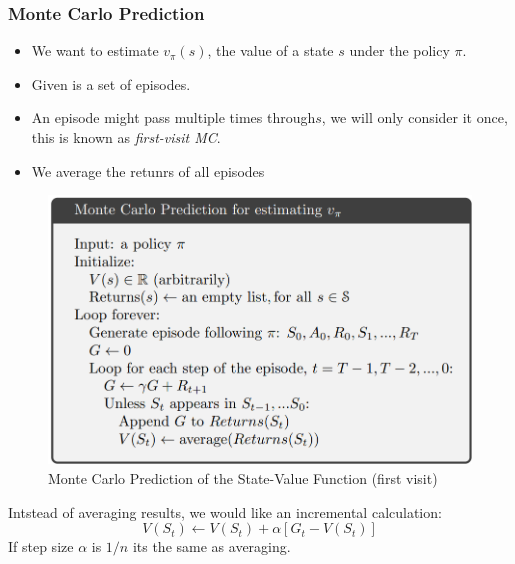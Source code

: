\subsubsection*{Monte Carlo Prediction}
\begin{itemize}
    \item We want to estimate \(v_\pi(s)\), the value of a state \(s\) under the policy \(\pi\).
    \item Given is a set of episodes.
    \item An episode might pass multiple times through\(s\), we will only consider it once, this is known as \textit{first-visit MC}.
    \item We average the retunrs of all episodes
\end{itemize}
\begin{figure}[!h]
    \includegraphics[width = \columnwidth]{figures/DeepReinforcementLearning1/MonteCarlo.png}
    \caption{Monte Carlo Prediction of the State-Value Function (first visit)}
\end{figure}

Intstead of averaging results, we would like an incremental calculation:
\[
    V(S_t) \leftarrow V(S_t) + \alpha[G_t - V(S_t)]
\]
If step size \(\alpha\) is \({1}/{n}\) its the same as averaging.


